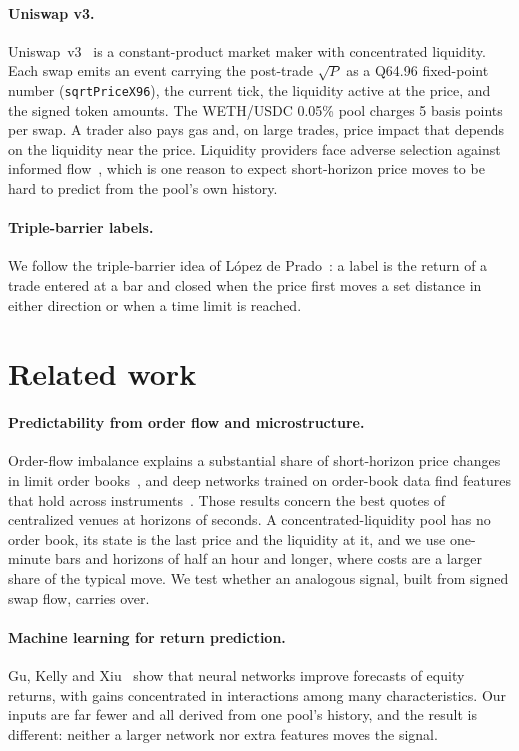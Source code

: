 \documentclass[11pt,a4paper]{article}
\begin{document}
\paragraph{Uniswap v3.}
Uniswap~v3~\cite{adams2021} is a constant-product market maker with
concentrated liquidity. Each swap emits an event carrying the post-trade
$\sqrt{P}$ as a Q64.96 fixed-point number (\texttt{sqrtPriceX96}), the
current tick, the liquidity active at the price, and the signed token amounts.
The WETH/USDC 0.05\% pool charges 5 basis points per swap. A trader also pays
gas and, on large trades, price impact that depends on the liquidity near the
price. Liquidity providers face adverse selection against informed
flow~\cite{milionis2022}, which is one reason to expect short-horizon price
moves to be hard to predict from the pool's own history.

\paragraph{Triple-barrier labels.}
We follow the triple-barrier idea of L\'opez de Prado~\cite{lopezdeprado2018}:
a label is the return of a trade entered at a bar and closed when the price
first moves a set distance in either direction or when a time limit is reached.

\section{Related work}

\paragraph{Predictability from order flow and microstructure.}
Order-flow imbalance explains a substantial share of short-horizon price
changes in limit order books~\cite{cont2014}, and deep networks trained on
order-book data find features that hold across instruments~\cite{sirignano2019}.
Those results concern the best quotes of centralized venues at horizons of
seconds. A concentrated-liquidity pool has no order book, its state is the
last price and the liquidity at it, and we use one-minute bars and horizons of
half an hour and longer, where costs are a larger share of the typical move.
We test whether an analogous signal, built from signed swap flow, carries over.

\paragraph{Machine learning for return prediction.}
Gu, Kelly and Xiu~\cite{gu2020} show that neural networks improve forecasts of
equity returns, with gains concentrated in interactions among many
characteristics. Our inputs are far fewer and all derived from one pool's
history, and the result is different: neither a larger network nor extra
features moves the signal.
\end{document}
